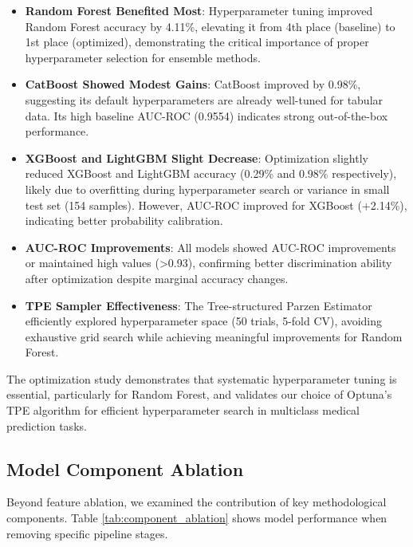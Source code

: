 \begin{itemize}
    \item \textbf{Random Forest Benefited Most}: Hyperparameter tuning improved Random Forest accuracy by 4.11\%, elevating it from 4th place (baseline) to 1st place (optimized), demonstrating the critical importance of proper hyperparameter selection for ensemble methods.
    
    \item \textbf{CatBoost Showed Modest Gains}: CatBoost improved by 0.98\%, suggesting its default hyperparameters are already well-tuned for tabular data. Its high baseline AUC-ROC (0.9554) indicates strong out-of-the-box performance.
    
    \item \textbf{XGBoost and LightGBM Slight Decrease}: Optimization slightly reduced XGBoost and LightGBM accuracy (0.29\% and 0.98\% respectively), likely due to overfitting during hyperparameter search or variance in small test set (154 samples). However, AUC-ROC improved for XGBoost (+2.14\%), indicating better probability calibration.
    
    \item \textbf{AUC-ROC Improvements}: All models showed AUC-ROC improvements or maintained high values (>0.93), confirming better discrimination ability after optimization despite marginal accuracy changes.
    
    \item \textbf{TPE Sampler Effectiveness}: The Tree-structured Parzen Estimator efficiently explored hyperparameter space (50 trials, 5-fold CV), avoiding exhaustive grid search while achieving meaningful improvements for Random Forest.
\end{itemize}

The optimization study demonstrates that systematic hyperparameter tuning is essential, particularly for Random Forest, and validates our choice of Optuna's TPE algorithm for efficient hyperparameter search in multiclass medical prediction tasks.

\subsection{Model Component Ablation}

Beyond feature ablation, we examined the contribution of key methodological components. Table \ref{tab:component_ablation} shows model performance when removing specific pipeline stages.

